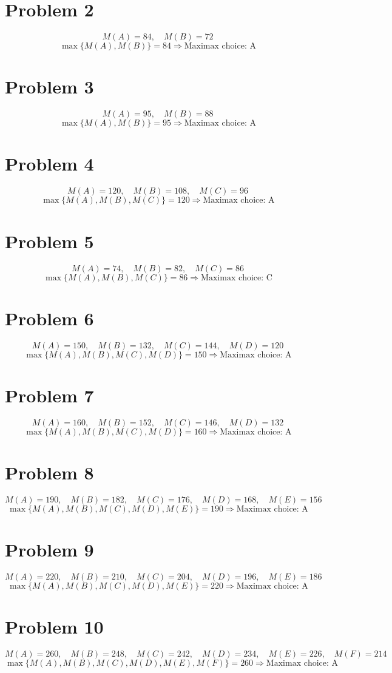 	\section*{Problem 2}
	\[
	M(A)=84,\quad M(B)=72
	\]
	\[
	\max\{M(A),M(B)\}=84 \Rightarrow \text{Maximax choice: A}
	\]
	\section*{Problem 3}
	\[
	M(A)=95,\quad M(B)=88
	\]
	\[
	\max\{M(A),M(B)\}=95 \Rightarrow \text{Maximax choice: A}
	\]
	\section*{Problem 4}
	\[
	M(A)=120,\quad M(B)=108,\quad M(C)=96
	\]
	\[
	\max\{M(A),M(B),M(C)\}=120 \Rightarrow \text{Maximax choice: A}
	\]
	\section*{Problem 5}
	\[
	M(A)=74,\quad M(B)=82,\quad M(C)=86
	\]
	\[
	\max\{M(A),M(B),M(C)\}=86 \Rightarrow \text{Maximax choice: C}
	\]
	\section*{Problem 6}
	\[
	M(A)=150,\quad M(B)=132,\quad M(C)=144,\quad M(D)=120
	\]
	\[
	\max\{M(A),M(B),M(C),M(D)\}=150 \Rightarrow \text{Maximax choice: A}
	\]
	\section*{Problem 7}
	\[
	M(A)=160,\quad M(B)=152,\quad M(C)=146,\quad M(D)=132
	\]
	\[
	\max\{M(A),M(B),M(C),M(D)\}=160 \Rightarrow \text{Maximax choice: A}
	\]
	\section*{Problem 8}
	\[
	M(A)=190,\quad M(B)=182,\quad M(C)=176,\quad M(D)=168,\quad M(E)=156
	\]
	\[
	\max\{M(A),M(B),M(C),M(D),M(E)\}=190 \Rightarrow \text{Maximax choice: A}
	\]
	\section*{Problem 9}
	\[
	M(A)=220,\quad M(B)=210,\quad M(C)=204,\quad M(D)=196,\quad M(E)=186
	\]
	\[
	\max\{M(A),M(B),M(C),M(D),M(E)\}=220 \Rightarrow \text{Maximax choice: A}
	\]
	\section*{Problem 10}
	\[
	M(A)=260,\quad M(B)=248,\quad M(C)=242,\quad M(D)=234,\quad M(E)=226,\quad M(F)=214
	\]
	\[
	\max\{M(A),M(B),M(C),M(D),M(E),M(F)\}=260 \Rightarrow \text{Maximax choice: A}
	\]

